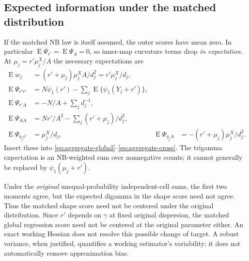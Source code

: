 \documentclass[11pt,a4paper]{article}
\newcommand{\E}{\operatorname{E}}
\numberwithin{equation}{section}
\begin{document}
\subsection{Expected information under the matched distribution}
If the matched NB law is itself assumed, the outer scores have mean zero.
In particular $\E\Psi_{r'}=\E\Psi_A=0$, so inner-map curvature terms
drop \emph{in expectation}. At ${\mu_j}={r'} \mu_j^X/A$ the necessary expectations are
\begin{align}
 \E w_j&=({r'}+{\mu_j})\mu_j^XA/d_j^2={r'} \mu_j^X/d_j,\\
 \E\Psi_{{r'}{r'}}&=N\psi_1({r'})-\sum_j\E\{\psi_1(Y_j+{r'})\},\\
 \E\Psi_{{r'} A}&=-N/A+\sum_jd_j^{-1},\\
 \E\Psi_{AA}&=N{r'}/A^2-\sum_j({r'}+{\mu_j})/d_j^2,\\
 \E\Psi_{\eta_j{r'}}&=\mu_j^X/d_j,&
 \E\Psi_{\eta_j A}&=-({r'}+{\mu_j})\mu_j^X/d_j^2.
\end{align}
Insert these into \eqref{eq:aggregate-global}--\eqref{eq:aggregate-cross}.
The trigamma expectation is an NB-weighted sum over nonnegative counts;
it cannot generally be replaced by $\psi_1({\mu_j}+{r'})$.

Under the \emph{original} unequal-probability independent-cell sums,
the first two moments agree, but the expected digamma in the shape score
need not agree. Thus the matched shape score need not be centered under
the original distribution. Since ${r'}$ depends on $\gamma$ at fixed
original dispersion, the matched global regression score need not be
centered at the original parameter either.
An exact working Hessian does not resolve this possible change of target.
A robust variance, when justified, quantifies a working estimator's
variability; it does not automatically remove approximation bias.
\end{document}
